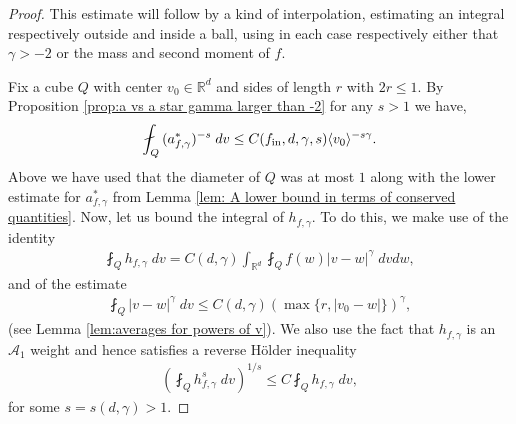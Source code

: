 \documentclass[12pt,american]{amsart}
\numberwithin{equation}{section}
\theoremstyle{plain}
\theoremstyle{definition}                  %
\def\fin{f_{\textnormal{in}}}
\begin{document}
\begin{proof}
  This estimate will follow by a kind of interpolation, estimating an integral respectively outside and inside a ball, using in each case respectively either that $\gamma> -2$ or the mass and second moment of $f$. 
  
   Fix a cube $Q$ with center $v_0 \in \mathbb{R}^d$ and sides of length $r$ with $2r\leq 1 $. By Proposition \ref{prop:a vs a star gamma larger than -2} for any $s>1$ we have,
    \begin{align*}
      \fint_{Q}{(a_{f,\gamma}^*)^{-s}}\;dv \leq C(\fin,d,\gamma,s)\langle v_0\rangle^{-s\gamma}.
    \end{align*}
  Above we have used that the diameter of $Q$ was at most $1$ along with the lower estimate for $a^*_{f,\gamma}$ from Lemma \ref{lem: A lower bound in terms of conserved quantities}. Now, let us bound the integral of $h_{f,\gamma}$. To do this, we make use of the identity 
    \begin{align*}
    \fint_{Q}h_{f,\gamma}\;dv  = C(d,\gamma)\int_{\mathbb{R}^d}\fint_{Q}f(w)|v-w|^\gamma\;dvdw,  
  \end{align*}
  and of the estimate
  \begin{align*}
     \fint_{Q} |v-w|^\gamma\;dv \leq C(d,\gamma) \left ( \max\{r,|v_0-w|\} \right )^\gamma,
  \end{align*}	 
 (see Lemma \ref{lem:averages for powers of v}). We also use the fact that $h_{f,\gamma}$ is an $\mathcal{A}_1$ weight and hence satisfies a reverse H\"older inequality 
 \begin{align*}
   \left(  \fint_{Q}h_{f,\gamma}^s\;dv\right)^{1/s} \le C  \fint_{Q}h_{f,\gamma}\;dv,
 \end{align*}
 for some $s=s(d,\gamma)>1$.  
 

\end{proof}
\end{document}
